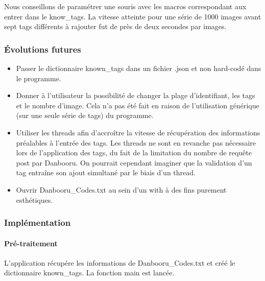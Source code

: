 \documentclass[a4paper,12pt]{article}
\begin{document}
Nous conseillons de paramétrer une souris avec les macros correspondant aux entrer dans le know\_tags. La vitesse atteinte pour une série de 1000 images avant sept tags différents à rajouter fut de près de deux secondes par images.
\subsubsection{Évolutions futures}
\begin{itemize}
\item Passer le dictionnaire known\_tags dans un fichier .json et non hard-codé dans le programme.
\item Donner à l'utilisateur la possibilité de changer la plage d'identifiant, les tags et le nombre d'image. Cela n'a pas été fait en raison de l'utilisation générique (sur une seule série de tags) du programme. 
\item Utiliser les threads afin d'accroître la vitesse de récupération des informations préalables à l'entrée des tags. Les threads ne sont en revanche pas nécessaire lors de l'application des tags, du fait de la limitation du nombre de requête \og post \fg{} par Danbooru.  On pourrait cependant imaginer que la validation d'un tag entraîne son ajout simultané par le biais d'un thread.
\item Ouvrir Danbooru\_Codes.txt au sein d'un \og with \fg{} à des fins purement esthétiques. 
\end{itemize}
\subsubsection{Implémentation}
\paragraph{Pré-traitement}
L'application récupére les informations de Danbooru\_Codes.txt et créé le dictionnaire known\_tags. La fonction main est lancée.
\end{document}
